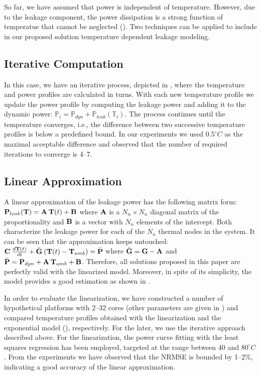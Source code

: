 So far, we have assumed that power is independent of temperature. However, due to the leakage component, the power dissipation is a strong function of temperatue that cannot be neglected (). Two techniques can be applied to include in our proposed solution temperature dependent leakage modeling.

\subsection{Iterative Computation} \label{sec:iterative-leakage}
In this case, we have an iterative process, depicted in , where the temperature and power profiles are calculated in turns. With each new temperature profile we update the power profile by computing the leakage power and adding it to the dynamic power: $\mathbb{P}_i = \mathbb{P}_{dyn} + \mathbb{P}_{leak}(\mathbb{T}_i)$. The process continues until the temperature converges, i.e., the difference between two successive temperature profiles is below a predefined bound. In our experiments we used $0.5^\circ C$ as the maximal acceptable difference and observed that the number of required iterations to converge is 4--7.

\subsection{Linear Approximation} \label{sec:linearized-leakage}
A linear approximation of the leakage power has the following matrix form: $\mathbf{P}_{leak}(\mathbf{T}) = \mathbf{A} \: \mathbf{T}(t) + \mathbf{B}$ where $\mathbf{A}$ is a $N_n \times N_n$ diagonal matrix of the proportionality and $\mathbf{B}$ is a vector with $N_n$ elements of the intercept. Both characterize the leakage power for each of the $N_n$ thermal nodes in the system. It can be seen that the approximation keeps  untouched: $\mathbf{C} \: \frac{d\mathbf{T}(t)}{dt} + \bar{\mathbf{G}} \: (\mathbf{T}(t) - \mathbf{T}_{amb}) = \bar{\mathbf{P}}$ where $\bar{\mathbf{G}} = \mathbf{G} - \mathbf{A}$ and $\bar{\mathbf{P}} = \mathbf{P}_{dyn} + \mathbf{A} \: \mathbf{T}_{amb} + \mathbf{B}$. Therefore, all solutions proposed in this paper are perfectly valid with the linearized model. Moreover, in spite of its simplicity, the model provides a good estimation as shown in \cite{liu2007}.

In order to evaluate the linearization, we have constructed a number of hypothetical platforms with 2--32 cores (other parameters are given in ) and compared temperature profiles obtained with the linearization and the exponential model (), respectively. For the later, we use the iterative approach described above. For the linearization, the power curve fitting with the least squares regression \cite{press2007} has been employed, targeted at the range between 40 and $80^\circ C$. From the experiments we have observed that the NRMSE is bounded by 1--2\%, indicating a good accuracy of the linear approximation.
